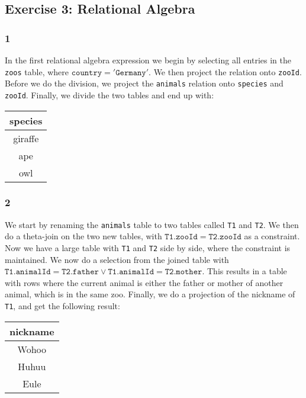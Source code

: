 \subsection{Exercise 3: Relational Algebra}


\subsubsection*{1}
In the first relational algebra expression we begin by selecting all entries in the \texttt{zoos} table, where $\mathtt{country} = \mathtt{'Germany'}$.
We then project the relation onto \texttt{zooId}.
Before we do the division, we project the \texttt{animals} relation onto \texttt{species} and \texttt{zooId}.
Finally, we divide the two tables and end up with:

\begin{center}
  \begin{tabular}{ c }
    \hline
    species \\  
    \hline
    giraffe \\
    ape \\
    owl \\
    \hline
  \end{tabular}
\end{center}

\subsubsection*{2}
We start by renaming the \texttt{animals} table to two tables called \texttt{T1} and \texttt{T2}.
We then do a theta-join on the two new tables, with $\mathtt{T1.zooId} = \mathtt{T2.zooId}$ as a constraint.
Now we have a large table with \texttt{T1} and \texttt{T2} side by side, where the constraint is maintained.
We now do a selection from the joined table with $\mathtt{T1.animalId} = \mathtt{T2.father} \vee \mathtt{T1.animalId} = \mathtt{T2.mother}$.
This results in a table with rows where the current animal is either the father or mother of another animal, which is in the same zoo.
Finally, we do a projection of the nickname of \texttt{T1}, and get the following result:

\begin{center}
  \begin{tabular}{ c }
    \hline
    nickname \\  
    \hline
    Wohoo \\
    Huhuu \\
    Eule \\
    \hline
  \end{tabular}
\end{center}

